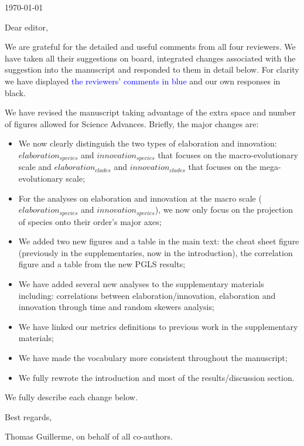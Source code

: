 \documentclass[12pt,letterpaper]{article}
\begin{document}
\noindent \today
\bigskip

\noindent Dear editor,
\bigskip

We are grateful for the detailed and useful comments from all four reviewers. We have taken all their suggestions on board, integrated changes associated with the suggestion into the manuscript and responded to them in detail below. For clarity we have displayed \textcolor{blue}{the reviewers’ comments in blue} and our own responses in black.

We have revised  the manuscript taking advantage of the extra space and number of figures allowed for Science Advances. Briefly, the major changes are:

\begin{itemize}
    \item We now clearly distinguish the two types of elaboration and innovation: $elaboration_{species}$ and $innovation_{species}$ that focuses on the macro-evolutionary scale and $elaboration_{clades}$ and $innovation_{clades}$ that focuses on the mega-evolutionary scale;
    \item For the analyses on elaboration and innovation at the macro scale ($elaboration_{species}$ and $innovation_{species}$), we now only focus on the projection of species onto their order’s major axes;
    \item We added two new figures and a table in the main text: the cheat sheet figure (previously in the supplementaries, now in the introduction), the correlation figure and a table from the new PGLS results; 
    \item We have added several new analyses to the supplementary materials including: correlations between elaboration/innovation, elaboration and innovation through time and random skewers analysis;
    \item We have linked our metrics definitions to previous work in the supplementary materials;
    \item We have made the vocabulary more consistent throughout the manuscript;
    \item We fully rewrote the introduction and most of the results/discussion section.
\end{itemize}

We fully describe each change below.

\bigskip

Best regards,

\bigskip

Thomas Guillerme, on behalf of all co-authors.
\end{document}
